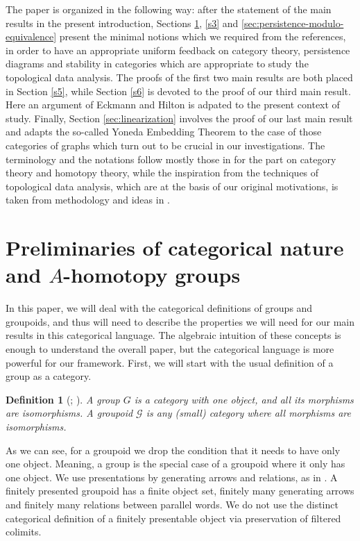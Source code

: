 \documentclass{amsart}
\newtheorem{definition}[theorem]{Definition}
\begin{document}
The paper is organized in the following way: after the statement of the main results in the present introduction, Sections \ref{s2}, \ref{s3} and \ref{sec:persistence-modulo-equivalence} present the minimal notions which we required from the references, in order to have an appropriate uniform feedback on category theory, persistence diagrams and stability in categories which are appropriate to study the topological data analysis. The proofs of the first two main results are both placed  in Section \ref{s5}, while Section \ref{s6} is devoted to the proof of our third main result. Here an argument of Eckmann and Hilton is adpated to the present context of study. Finally, Section \ref{sec:linearization} involves the proof of our last main result and adapts the so-called Yoneda Embedding Theorem to the case of those categories of graphs which turn out to be crucial in our investigations. The terminology and the notations follow mostly those in \cite{ronbrown1, ronbrown2,  maclane1998categories} for the part on category theory and homotopy theory, while the inspiration from the techniques of topological data analysis, which are at the basis of our original motivations, is taken from methodology and ideas in \cite{gc, edelsbrunner, patel2016generalized}.


\section{Preliminaries of categorical nature and \texorpdfstring{$A$}{A}-homotopy groups}\label{s2}

In this paper, we will deal with the categorical definitions of groups and groupoids, and thus will need to describe the properties we will need for our main results in this categorical language. The algebraic intuition of these concepts is enough to understand the overall paper, but the categorical language is more powerful for our framework. First, we will start with the usual definition of a group as a category.

\begin{definition}[{\cite[Sections~I.2 and I.5, pp.~11 and 20]{maclane1998categories}; \cite[Section~6.1]{ronbrown1}}]
A \textit{group} $G$ is a category with one object, and all its morphisms are isomorphisms.    A \textit{groupoid} $\mathcal{G}$ is any (small) category where all morphisms are isomorphisms.    
\end{definition}

As we can see, for a groupoid we drop the condition that it needs to have only one object. Meaning, a group is the special case of a groupoid where it only has one object. We use presentations by generating arrows and relations, as in \cite[Sections~8.2--8.3]{ronbrown1}. A finitely presented groupoid has a finite object set, finitely many generating arrows and finitely many relations between parallel words. We do not use the distinct categorical definition of a finitely presentable object via preservation of filtered colimits.
\end{document}
